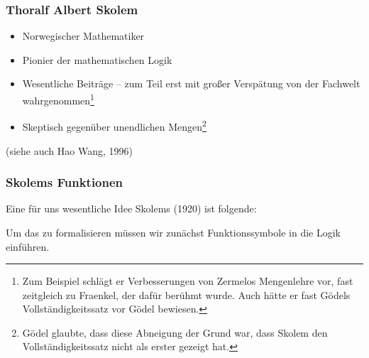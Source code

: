 \documentclass[onlymath]{beamer}
\begin{document}
\begin{frame}\frametitle{Thoralf Albert Skolem }

\begin{itemize}
\item Norwegischer Mathematiker
\item Pionier der mathematischen Logik
\item Wesentliche Beiträge -- zum Teil erst mit großer Verspätung von der Fachwelt wahrgenommen\footnote{Zum Beispiel schlägt er Verbesserungen von Zermelos Mengenlehre vor, fast zeitgleich zu Fraenkel, der dafür berühmt wurde. Auch hätte er fast Gödels Vollständigkeitssatz vor Gödel bewiesen.}
\item Skeptisch gegenüber unendlichen Mengen\footnote{Gödel glaubte, dass diese Abneigung der Grund war, dass Skolem den Vollständigkeitssatz nicht als erster gezeigt hat.}
\end{itemize}\bigskip

(siehe auch Hao Wang, 1996)

\end{frame}

\begin{frame}\frametitle{Skolems Funktionen}

\alert{Eine für uns wesentliche Idee Skolems (1920) ist folgende:}\medskip

\medskip\pause

\medskip

Um das zu formalisieren müssen wir zunächst Funktionssymbole in die Logik einführen.

\end{frame}
\end{document}
